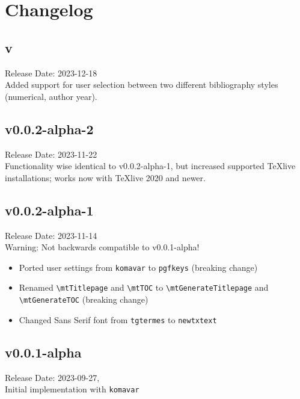 \chapter{Changelog}
	\section{v\releaseVersion}
		Release Date: 2023-12-18\\
		Added support for user selection between two different bibliography styles (numerical, author year).
	
	\section{v0.0.2-alpha-2}
		Release Date: 2023-11-22\\
		Functionality wise identical to v0.0.2-alpha-1, but increased supported TeXlive installations; works now with TeXlive 2020 and newer.
		
	\section{v0.0.2-alpha-1}
		Release Date: 2023-11-14\\
		Warning: Not backwards compatible to v0.0.1-alpha!
		\begin{itemize}
			\item Ported user settings from \verb|komavar| to \verb|pgfkeys| (breaking change)
			\item Renamed \verb|\mtTitlepage| and \verb|\mtTOC| to \verb|\mtGenerateTitlepage| and\\ \verb|\mtGenerateTOC| (breaking change)
			\item Changed Sans Serif font from \verb|tgtermes| to \verb|newtxtext| 
		\end{itemize}
	
	\section{v0.0.1-alpha}
		Release Date: 2023-09-27,\\
		Initial implementation with \verb|komavar|